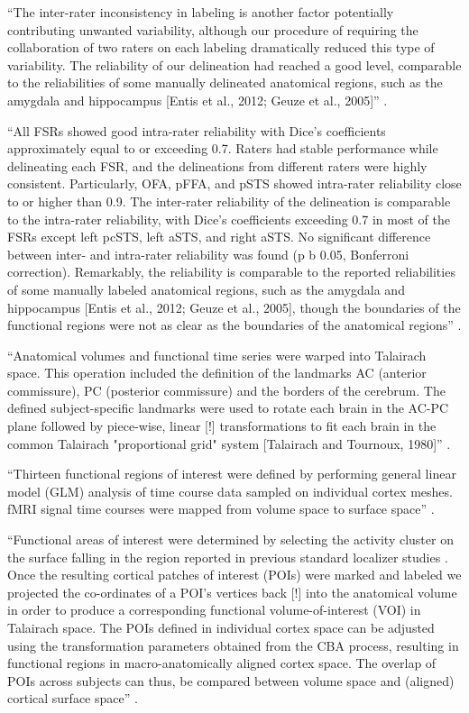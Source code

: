``The inter-rater inconsistency in labeling is another factor potentially
contributing unwanted variability, although our procedure of requiring the
collaboration of two raters on each labeling dramatically reduced this type of
variability.
%
The reliability of our delineation had reached a good level, comparable to the
reliabilities of some manually delineated anatomical regions, such as the
amygdala and hippocampus [Entis et al., 2012; Geuze et al., 2005]''
\citep{zhen2015quantifying}.

``All FSRs showed good intra-rater reliability with Dice's coefficients
approximately equal to or exceeding 0.7.
%
Raters had stable performance while delineating each FSR, and the delineations
from different raters were highly consistent.
%
Particularly, OFA, pFFA, and pSTS showed intra-rater reliability close to or
higher than 0.9.
%
The inter-rater reliability of the delineation is comparable to the intra-rater
reliability, with Dice's coefficients exceeding 0.7 in most of the FSRs except
left pcSTS, left aSTS, and right aSTS.
%
No significant difference between inter- and intra-rater reliability was found
(p b 0.05, Bonferroni correction).
%
Remarkably, the reliability is comparable to the reported reliabilities of some
manually labeled anatomical regions, such as the amygdala and hippocampus [Entis
et al., 2012; Geuze et al., 2005], though the boundaries of the functional
regions were not as clear as the boundaries of the anatomical regions''
\citep{zhen2015quantifying}.



``Anatomical volumes and functional time series were warped into Talairach
space.
%
This operation included the definition of the landmarks AC (anterior
commissure), PC (posterior commissure) and the borders of the cerebrum.
%
The defined subject-specific landmarks were used to rotate each brain in the
AC-PC plane followed by piece-wise, linear [!] transformations to fit each brain
in the common Talairach "proportional grid" system [Talairach and Tournoux,
1980]'' \citep{frost2012measuring}.

``Thirteen functional regions of interest were defined by performing general
linear model (GLM) analysis of time course data sampled on individual cortex
meshes.
%
fMRI signal time courses were mapped from volume space to surface
space'' \citep{frost2012measuring}.

``Functional areas of interest were determined by selecting the activity cluster
on the surface falling in the region reported in previous standard localizer
studies \citep{frost2012measuring}.
%
Once the resulting cortical patches of interest (POIs) were marked and labeled
we projected the co-ordinates of a POI's vertices back [!] into the anatomical
volume in order to produce a corresponding functional volume-of-interest (VOI)
in Talairach space.
%
The POIs defined in individual cortex space can be adjusted using the
transformation parameters obtained from the CBA process, resulting in functional
regions in macro-anatomically aligned cortex space.
%
The overlap of POIs across subjects can thus, be compared between volume space
and (aligned) cortical surface space'' \citep{frost2012measuring}.

